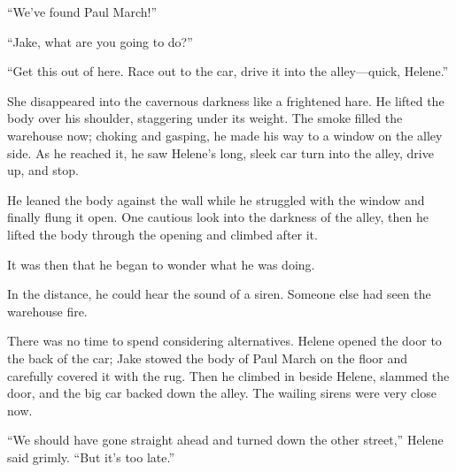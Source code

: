 \documentclass{novel}
\begin{document}
“We’ve found Paul March!”

\vspace{2\nbs}
\clearpage
\thispagestyle{empty}

\begin{ChapterStart}
\vspace{3\nbs}
\end{ChapterStart}

“Jake, what are you going to do?”

“Get this out of here. Race out to the car, drive it into the alley—quick, Helene.”

She disappeared into the cavernous darkness like a frightened hare. He lifted the body over his shoulder, staggering under its weight. The smoke filled the warehouse now; choking and gasping, he made his way to a window on the alley side. As he reached it, he saw Helene’s long, sleek car turn into the alley, drive up, and stop.

He leaned the body against the wall while he struggled with the window and finally flung it open. One cautious look into the darkness of the alley, then he lifted the body through the opening and climbed after it.

It was then that he began to wonder what he was doing.

In the distance, he could hear the sound of a siren. Someone else had seen the warehouse fire.

There was no time to spend considering alternatives. Helene opened the door to the back of the car; Jake stowed the body of Paul March on the floor and carefully covered it with the rug. Then he climbed in beside Helene, slammed the door, and the big car backed down the alley. The wailing sirens were very close now.

“We should have gone straight ahead and turned down the other street,” Helene said grimly. “But it’s too late.”
\end{document}
